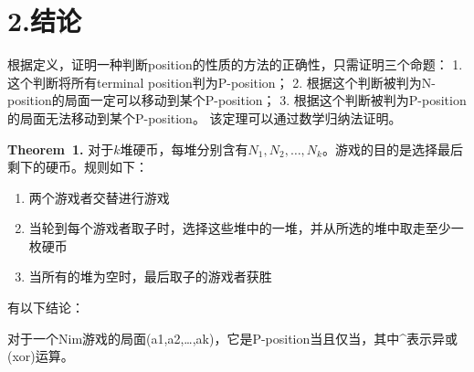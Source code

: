 \documentclass{article}
\begin{document}
\section{2.\hspace*{0.5em}结论}\label{section}%

\noindent{}根据定义，证明一种判断position的性质的方法的正确性，只需证明三个命题： 
1. 这个判断将所有terminal position判为P-position；
2. 根据这个判断被判为N-position的局面一定可以移动到某个P-position；
3. 根据这个判断被判为P-position的局面无法移动到某个P-position。
该定理可以通过数学归纳法证明。%

\begin{mdbmarginx}{1ex}{0pt}{1ex}{0pt}%
\noindent{}\textbf{Theorem~1.} \mdbr
{}对于$k$堆硬币，每堆分别含有$N_1,N_2,\dots,N_k$。游戏的目的是选择最后剩下的硬币。规则如下：%

\begin{enumerate}%

\item{}
两个游戏者交替进行游戏%

\item{}
当轮到每个游戏者取子时，选择这些堆中的一堆，并从所选的堆中取走至少一枚硬币%

\item{}
当所有的堆为空时，最后取子的游戏者获胜%
\end{enumerate}%

\noindent{}有以下结论：%

对于一个Nim游戏的局面(a1,a2,\dots{},ak)，它是P-position当且仅当，其中\textasciicircum{}表示异或(xor)运算。%
\label{th}%
\end{mdbmarginx}%
\end{document}
